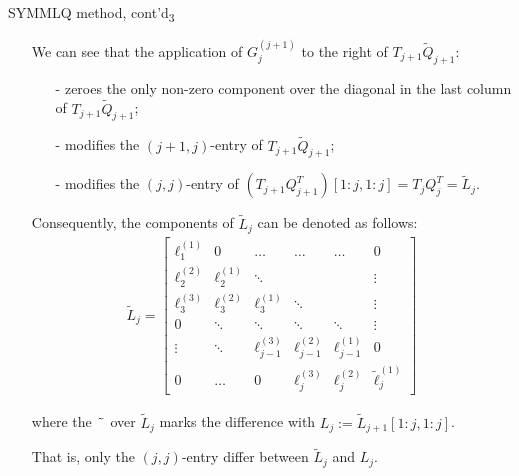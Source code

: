 \documentclass[t,usepdftitle=false]{beamer}
\begin{document}
\begin{frame}{SYMMLQ method, cont'd\textsubscript{3}}
\begin{itemize}
\item[] We can see that the application of $G_{j}^{(j+1)}$ to the right of $T_{j+1}\tilde{Q}_{j+1}$:
\begin{itemize}\normalsize
\item[-] zeroes the only non-zero component over the diagonal in the last column of $T_{j+1}\tilde{Q}_{j+1}$;
\item[-] modifies the $(j+1,j)$-entry of $T_{j+1}\tilde{Q}_{j+1}$;
\item[-] modifies the $(j,j)$-entry of $(T_{j+1}Q_{j+1}^T)[1:j,1:j]=T_jQ_j^T=\tilde{L}_j$.
\end{itemize}
Consequently, the components of $\tilde{L}_j$ can be denoted as follows:
{\footnotesize
\begin{align*}
\tilde{L}_j=
\begin{bmatrix}
\ell_1^{(1)}&0&\dots&\dots&\dots&0\\
\ell_2^{(2)}&\ell_2^{(1)}&\ddots&&&\vdots\\
\ell_3^{(3)}&\ell_3^{(2)}&\ell_3^{(1)}&\ddots&&\vdots\\
0&\ddots&\ddots&\ddots&\ddots&\vdots\\
\vdots&\ddots&\ell_{j-1}^{(3)}&\ell_{j-1}^{(2)}&\ell_{j-1}^{(1)}&0\\
0&\dots&0&\ell_j^{(3)}&\ell_{j}^{(2)}&\tilde{\ell}_j^{(1)}
\end{bmatrix}
\end{align*}}
\item[]where the $\tilde{\hphantom{x}}$ over $\tilde{L}_j$ marks the difference with $L_j:=\tilde{L}_{j+1}[1:j,1:j]$.
\item[] That is, only the $(j,j)$-entry differ between $\tilde{L}_j$ and $L_j$.
\end{itemize}
\end{frame}
\end{document}

